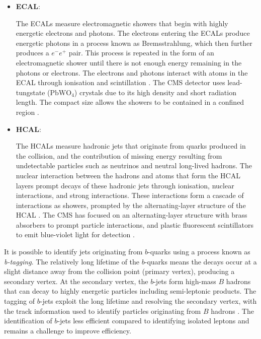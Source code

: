 \begin{itemize}
  \item \textbf{ECAL}: \par
  The ECALs measure electromagnetic showers that begin with highly energetic electrons and photons. The electrons entering the ECALs produce energetic photons in a process known as Bremsstrahlung, which then further produces a $e^{-}e^{+}$ pair. This process is repeated in the form of an electromagnetic shower until there is not enough energy remaining in the photons or electrons. The electrons and photons interact with atoms in the ECAL through ionisation and scintillation \cite{thomson2013modern}. The CMS detector uses lead-tungstate ($\text{PbWO}_4$) crystals due to its high density and short radiation length. The compact size allows the showers to be contained in a confined region \cite{chatrchyan2008cms}. 
  
  \item \textbf{HCAL}: \par
  The HCALs measure hadronic jets that originate from quarks produced in the collision, and the contribution of missing energy resulting from undetectable particles such as neutrinos and neutral long-lived hadrons. The nuclear interaction between the hadrons and atoms that form the HCAL layers prompt decays of these hadronic jets through ionisation, nuclear interactions, and strong interactions. These interactions form a cascade of interactions as showers, prompted by the alternating-layer structure of the HCAL \cite{thomson2013modern}. The CMS has focused on an alternating-layer structure with brass absorbers to prompt particle interactions, and plastic fluorescent scintillators to emit blue-violet light for detection \cite{chatrchyan2008cms}. 
\end{itemize}

It is possible to identify jets originating from $b$-quarks using a process known as \textit{b-tagging}. The relatively long lifetime of the $b$-quarks means the decays occur at a slight distance away from the collision point (primary vertex), producing a secondary vertex. At the secondary vertex, the $b$-jets form high-mass $B$ hadrons that can decay to highly energetic particles including semi-leptonic products. The tagging of $b$-jets exploit the long lifetime and resolving the secondary vertex, with the track information used to identify particles originating from $B$ hadrons \cite{collaboration_2013}. The identification of $b$-jets less efficient compared to identifying isolated leptons and remains a challenge to improve efficiency. 

